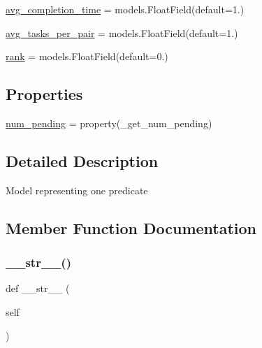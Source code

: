 \begin{DoxyCompactItemize}
\item 
\mbox{\hyperlink{classdynamicfilterapp_1_1models_1_1_predicate_a2f52b3007bbd1aa958220863bec30b0e}{avg\+\_\+completion\+\_\+time}} = models.\+Float\+Field(default=1.)
\item 
\mbox{\hyperlink{classdynamicfilterapp_1_1models_1_1_predicate_a6d5659d7cb67dfb46915ea0ff9c3d0e5}{avg\+\_\+tasks\+\_\+per\+\_\+pair}} = models.\+Float\+Field(default=1.)
\item 
\mbox{\hyperlink{classdynamicfilterapp_1_1models_1_1_predicate_aab463cca26e853227a05587642f8e578}{rank}} = models.\+Float\+Field(default=0.)
\end{DoxyCompactItemize}
\subsection*{Properties}
\begin{DoxyCompactItemize}
\item 
\mbox{\hyperlink{classdynamicfilterapp_1_1models_1_1_predicate_a098558b4669412bf8a4958680b5ea760}{num\+\_\+pending}} = property(\+\_\+get\+\_\+num\+\_\+pending)
\end{DoxyCompactItemize}


\subsection{Detailed Description}
\begin{DoxyVerb}Model representing one predicate
\end{DoxyVerb}
 

\subsection{Member Function Documentation}
\mbox{\label{classdynamicfilterapp_1_1models_1_1_predicate_a23e8041ce1015febe4fdace3225714f9}} 
\subsubsection{\texorpdfstring{\_\_str\_\_()}{\_\_str\_\_()}}
{\footnotesize\ttfamily def \+\_\+\+\_\+str\+\_\+\+\_\+ (\begin{DoxyParamCaption}\item[{}]{self }\end{DoxyParamCaption})}

